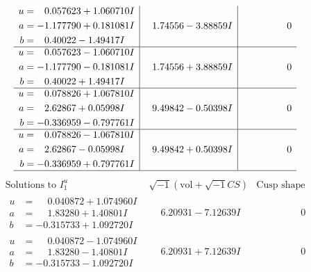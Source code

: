 \documentclass[1p]{elsarticle_modified}
\theoremstyle{definition}
\newcommand{\I}{\sqrt{-1}}
\begin{document}
$$\begin{array}{c|c|c}
\begin{aligned}
u &= \phantom{-}0.057623 + 1.060710 I \\
a &= -1.177790 + 0.181081 I \\
b &= \phantom{-}0.40022 - 1.49417 I\end{aligned}
 & \phantom{-}1.74556 - 3.88859 I & \phantom{-0.000000 } 0 \\ \hline\begin{aligned}
u &= \phantom{-}0.057623 - 1.060710 I \\
a &= -1.177790 - 0.181081 I \\
b &= \phantom{-}0.40022 + 1.49417 I\end{aligned}
 & \phantom{-}1.74556 + 3.88859 I & \phantom{-0.000000 } 0 \\ \hline\begin{aligned}
u &= \phantom{-}0.078826 + 1.067810 I \\
a &= \phantom{-}2.62867 + 0.05998 I \\
b &= -0.336959 - 0.797761 I\end{aligned}
 & \phantom{-}9.49842 - 0.50398 I & \phantom{-0.000000 } 0 \\ \hline\begin{aligned}
u &= \phantom{-}0.078826 - 1.067810 I \\
a &= \phantom{-}2.62867 - 0.05998 I \\
b &= -0.336959 + 0.797761 I\end{aligned}
 & \phantom{-}9.49842 + 0.50398 I & \phantom{-0.000000 } 0\\
 \hline 
 \end{array}$$\newpage$$\begin{array}{c|c|c}  
\text{Solutions to }I^u_{1}& \I (\text{vol} + \sqrt{-1}CS) & \text{Cusp shape}\\
 \hline 
\begin{aligned}
u &= \phantom{-}0.040872 + 1.074960 I \\
a &= \phantom{-}1.83280 + 1.40801 I \\
b &= -0.315733 + 1.092720 I\end{aligned}
 & \phantom{-}6.20931 - 7.12639 I & \phantom{-0.000000 } 0 \\ \hline\begin{aligned}
u &= \phantom{-}0.040872 - 1.074960 I \\
a &= \phantom{-}1.83280 - 1.40801 I \\
b &= -0.315733 - 1.092720 I\end{aligned}
 & \phantom{-}6.20931 + 7.12639 I & \phantom{-0.000000 } 0 \\ \hline\begin{aligned}

\end{aligned}
\end{array}$$
\end{document}
